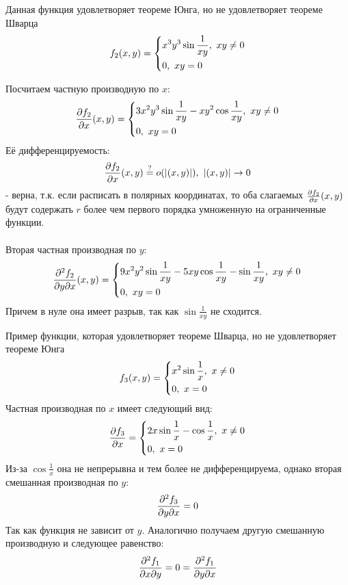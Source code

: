 \begin{example}
	Данная функция удовлетворяет теореме Юнга, но не удовлетворяет теореме Шварца
	\[
		f_2(x, y) = \left\{\begin{aligned}
			&{x^3 y^3 \sin \frac{1}{xy},\ xy \neq 0}
			\\
			&{0,\ xy = 0}
		\end{aligned}\right.
	\]
	
	Посчитаем частную производную по $x$:
	\[
		\pd{f_2}{x}(x, y) = \System{
			&{3x^2y^3 \sin \frac{1}{xy} - xy^2 \cos \frac{1}{xy},\ xy \neq 0}
			\\
			&{0,\ xy = 0}
		}
	\]
	Её дифференцируемость:
	\[
		\pd{f_2}{x}(x,y) \stackrel{?}{=} o(|(x,y)|),\ |(x,y)|\to0
	\]
	- верна, т.к. если расписать в полярных координатах, то оба слагаемых $\frac{\partial f_2}{\partial x}(x,y)$ будут содержать $r$ более чем первого порядка умноженную на ограниченные функции.
	\\\\
	Вторая частная производная по $y$:
	\[
		\frac{\partial^2 f_2}{\partial y \partial x}(x, y) = \left\{\begin{aligned}
			&{9x^2y^2 \sin \frac{1}{xy} - 5xy\cos\frac{1}{xy} - \sin\frac{1}{xy},\ xy \neq 0}
			\\
			&{0,\ xy = 0}
		\end{aligned}\right.
	\]
	Причем в нуле она имеет разрыв, так как $\sin\frac{1}{xy}$ не сходится.
\end{example}

\begin{example}
	Пример функции, которая удовлетворяет теореме Шварца, но не удовлетворяет теореме Юнга
	\[
		f_3(x, y) = \left\{\begin{aligned}
			&{x^2 \sin \frac{1}{x},\ x \neq 0}
			\\
			&{0,\ x = 0}
		\end{aligned}\right.
	\]
	Частная производная по $x$ имеет следующий вид:
	\[
		\frac{\partial f_3}{\partial x} = \left\{\begin{aligned}
			&{2x \sin \frac{1}{x} - \cos\frac{1}{x},\ x \neq 0}
			\\
			&{0,\ x = 0}
		\end{aligned}\right.
	\]
	Из-за $\cos \frac{1}{x}$ она не непрерывна и тем более не дифференцируема, однако вторая смешанная производная по $y$:
	\[
		\frac{\partial^2 f_3}{\partial y \partial x} = 0
	\]
	Так как функция не зависит от $y$. Аналогично получаем другую смешанную производную и следующее равенство:
	\[
		\frac{\partial^2 f_1}{\partial x \partial y} = 0 = \frac{\partial^2 f_1}{\partial y \partial x}
	\]
\end{example}

